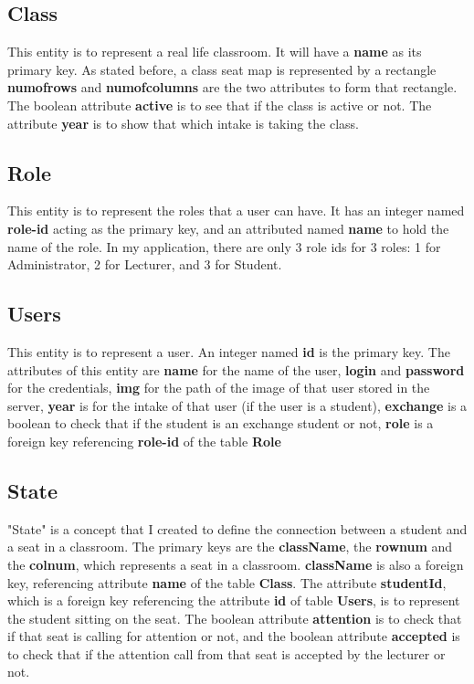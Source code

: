 \documentclass[a4paper, 11pt,openany]{book} %
\begin{document}
\subsection{Class}
This entity is to represent a real life classroom. It will have a \textbf{name} as its primary key. As stated before, a class seat map is represented by a rectangle \textbf{numofrows} and \textbf{numofcolumns} are the two attributes to form that rectangle. The boolean attribute \textbf{active} is to see that if the class is active or not. The attribute \textbf{year} is to show that which intake is taking the class.

\subsection{Role}
This entity is to represent the roles that a user can have. It has an integer named \textbf{role-id} acting as the primary key, and an attributed named \textbf{name} to hold the name of the role. In my application, there are only 3 role ids for 3 roles: 1 for Administrator, 2 for Lecturer, and 3 for Student.

\subsection{Users}
This entity is to represent a user. An integer named \textbf{id} is the primary key. The attributes of this entity are \textbf{name} for the name of the user, \textbf{login} and \textbf{password} for the credentials, \textbf{img} for the path of the image of that user stored in the server, \textbf{year} is for the intake of that user (if the user is a student), \textbf{exchange} is a boolean to check that if the student is an exchange student or not, \textbf{role} is a foreign key referencing \textbf{role-id} of the table \textbf{Role}  

\subsection{State}
"State" is a concept that I created to define the connection between a student and a seat in a classroom. The primary keys are the \textbf{className}, the \textbf{rownum} and the \textbf{colnum}, which represents a seat in a classroom. \textbf{className} is also a foreign key, referencing attribute \textbf{name} of the table \textbf{Class}. The attribute \textbf{studentId}, which is a foreign key referencing the attribute \textbf{id} of table \textbf{Users}, is to represent the student sitting on the seat. The boolean attribute \textbf{attention} is to check that if that seat is calling for attention or not, and the boolean attribute \textbf{accepted} is to check that if the attention call from that seat is accepted by the lecturer or not.
\end{document}
